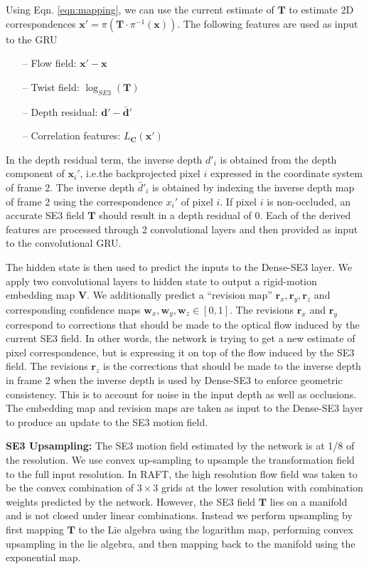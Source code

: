 \documentclass[final]{cvpr}
\begin{document}
Using Eqn. \ref{eqn:mapping}, we can use the current estimate of $\mathbf{T}$ to estimate 2D correspondences $\mathbf{x}' = \pi(\mathbf{T} \cdot \pi^{-1}(\mathbf{x}))$. The following features are used as input to the GRU
\begin{itemize}
\item[--] Flow field:  $\mathbf{x}' - \mathbf{x}$
\item[--] Twist field:  $\log_{SE3} (\mathbf{T})$
\item[--] Depth residual: $\mathbf{d}' - \mathbf{\bar{d}}'$
\item[--] Correlation features: $L_\mathbf{C}(\mathbf{x}')$
\end{itemize}
In the depth residual term, the inverse depth $d'_i$ is obtained from the depth component of $\mathbf{x}_i'$, i.e.\@ the backprojected pixel $i$ expressed in the coordinate system of frame 2. The inverse depth $\bar{d}'_i$ is obtained by indexing the inverse depth map of frame 2 using
the correspondence $x_i'$ of pixel $i$.
If pixel $i$ is non-occluded, an accurate SE3 field $\mathbf{T}$ should result in a depth residual of 0. Each of the derived features are processed through 2 convolutional layers and then provided as input to the convolutional GRU.

The hidden state is then used to predict the inputs to the Dense-SE3 layer. We apply two convolutional layers to hidden state to output a rigid-motion embedding map $\mathbf{V}$. We additionally predict a ``revision map'' $\mathbf{r}_x, \mathbf{r}_y, \mathbf{r}_z$ and corresponding confidence maps $\mathbf{w}_x, \mathbf{w}_y, \mathbf{w}_z \in [0,1]$. The revisions $\mathbf{r}_x$ and $\mathbf{r}_y$ correspond to corrections that should be   made to the optical flow induced by the current SE3 field. In other words, the network is trying to get a new estimate of pixel correspondence, but is expressing it on top of the flow induced by the SE3 field. 
The revisions $\mathbf{r}_z$ is the corrections that should be made to the inverse depth in frame 2 when the inverse depth is used by Dense-SE3 to enforce geometric consistency. This is to account for noise in the input depth as well as occlusions. The embedding map and revision maps are taken as input to the Dense-SE3 layer to produce an update to the SE3 motion field. 


\vspace{1mm} \noindent \textbf{SE3 Upsampling:} The SE3 motion field estimated by the network is at 1/8 of the resolution. We use convex up-sampling \cite{teed2020raft} to upsample the transformation field to the full input resolution. In RAFT\cite{teed2020raft}, the high resolution flow field was taken to be the convex combination of $3 \times 3$ grids at the lower resolution with combination weights predicted by the network. However, the SE3 field $\mathbf{T}$ lies on a manifold and is not closed under linear combinations. Instead we perform upsampling by first mapping $\mathbf{T}$ to the Lie algebra using the logarithm map, performing convex upsampling in the lie algebra, and then mapping back to the manifold using the exponential map.
\end{document}
